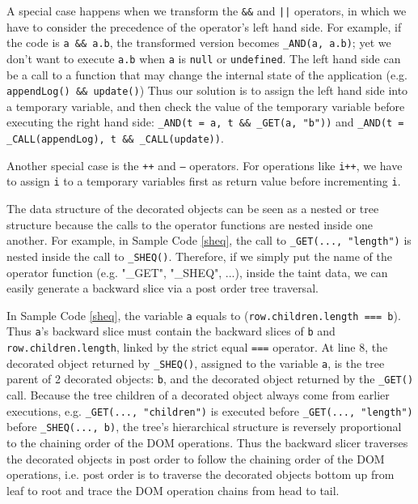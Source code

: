 A special case happens when we transform the {\tt \&\&} and {\tt |}{\tt |} operators, in which we have to consider the precedence of the operator's left hand side.   
For example, if the code is {\tt a \&\& a.b}, the transformed version becomes {\tt \_AND(a, a.b)}; yet we don't want to execute {\tt a.b} when {\tt a} is {\tt null} or {\tt undefined}.  
The left hand side can be a call to a function that may change the internal state of the application (e.g. {\tt appendLog() \&\& update()})
Thus our solution is to assign the left hand side into a temporary variable, and then check the value of the temporary variable before executing the right hand side: {\tt \_AND(t = a, t \&\& \_GET(a, "b"))} and {\tt \_AND(t = \_CALL(appendLog), t \&\& \_CALL(update))}.  

Another special case is the {\tt ++} and {\tt --} operators.  For operations like {\tt i++}, we have to assign {\tt i} to a temporary variables first as return value before incrementing {\tt i}.


The data structure of the decorated objects can be seen as a nested or tree structure because the calls to the operator functions are nested inside one another.  For example, in Sample Code \ref{sheq}, the call to {\tt \_GET(..., "length")} is nested inside the call to {\tt \_SHEQ()}.  
Therefore, if we simply put the name of the operator function (e.g. "\_GET", "\_SHEQ", ...), inside the taint data, we can easily generate a backward slice via a post order tree traversal.  

In Sample Code \ref{sheq}, the variable {\tt a} equals to ({\tt row.children.length === b}).  Thus {\tt a}'s backward slice must contain the backward slices of {\tt b} and {\tt row.children.length}, linked by the strict equal {\tt ===} operator.  
At line 8, the decorated object returned by {\tt \_SHEQ()}, assigned to the variable {\tt a}, is the tree parent of 2 decorated objects: {\tt b}, and the decorated object returned by the {\tt \_GET()} call.  
Because the tree children of a decorated object always come from earlier executions, e.g. {\tt \_GET(..., "children")} is executed before {\tt \_GET(..., "length")} before {\tt \_SHEQ(..., b)}, the tree's hierarchical structure is reversely proportional to the chaining order of the DOM operations.  
Thus the backward slicer traverses the decorated objects in post order to follow the chaining order of the DOM operations, i.e. post order is to traverse the decorated objects bottom up from leaf to root and trace the DOM operation chains from head to tail.  

